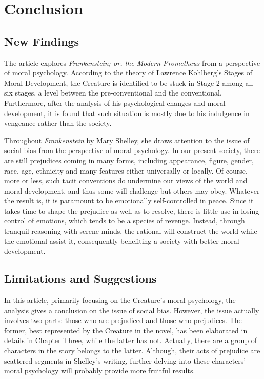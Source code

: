 \chapter{Conclusion} %
\label{cha:conclusion}
\section{New Findings} %
\label{sec:new_findings}
\begin{text}

The article explores \textit{Frankenstein; or, the Modern Prometheus} from a perspective of moral psychology. According to the theory of Lawrence Kohlberg's Stages of Moral Development, the Creature is identified to be stuck in Stage 2\textonehalf{} among all six stages, a level between the pre-conventional and the conventional. Furthermore, after the analysis of his psychological changes and moral development, it is found that such situation is mostly due to his indulgence in vengeance rather than the society.

Throughout \textit{Frankenstein} by Mary Shelley, she draws attention to the issue of social bias from the perspective of moral psychology. In our present society, there are still prejudices coming in many forms, including appearance, figure, gender, race, age, ethnicity and many features either universally or locally. Of course, more or less, such tacit conventions do undermine our views of the world and moral development, and thus some will challenge but others may obey. Whatever the result is, it is paramount to be emotionally self-controlled in peace. Since it takes time to shape the prejudice as well as to resolve, there is little use in losing control of emotions, which tends to be a species of revenge. Instead, through tranquil reasoning with serene minds, the rational will construct the world while the emotional assist it, consequently benefiting a society with better moral development.

\end{text}
\section{Limitations and Suggestions} %
\label{sec:limitations_and_suggestions}
\begin{text}

In this article, primarily focusing on the Creature's moral psychology, the analysis gives a conclusion on the issue of social bias. However, the issue actually involves two parts: those who are prejudiced and those who prejudices. The former, best represented by the Creature in the novel, has been elaborated in details in Chapter Three, while the latter has not. Actually, there are a group of characters in the story belongs to the latter. Although, their acts of prejudice are scattered segments in Shelley's writing, further delving into these characters' moral psychology will probably provide more fruitful results.
\end{text}
